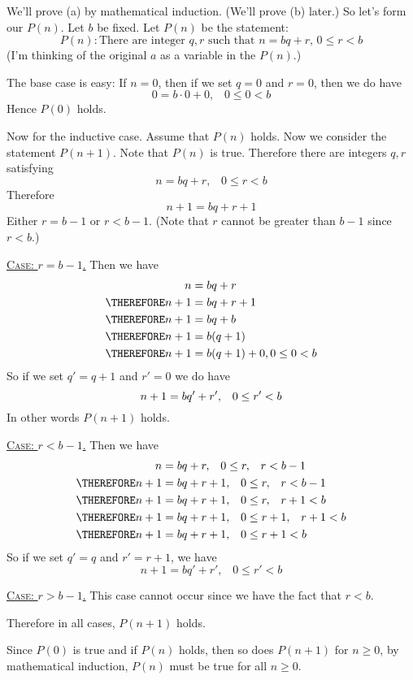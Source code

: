 
We'll prove (a) by mathematical induction.
(We'll prove (b) later.)
So let's form our $P(n)$.
Let $b$ be fixed.
Let $P(n)$ be the statement:
\[
P(n): \text{There are integer $q,r$ such that $n = bq + r$, $0 \leq r < b$}
\]
(I'm thinking of the original $a$ as a variable in the $P(n)$.)

The base case is easy: If $n = 0$, then if we set $q = 0$ and $r = 0$, then we do have
\[
0 = b \cdot 0 + 0, \,\,\,\,\, 0 \leq 0 < b
\]
Hence $P(0)$ holds.

Now for the inductive case. 
Assume that $P(n)$ holds.
Now we consider the statement $P(n+1)$.
Note that $P(n)$ is true. Therefore there are integers $q,r$ satisfying
\[
n = bq + r, \,\,\,\,\, 0 \leq r < b 
\]
Therefore
\[
n + 1 = bq + r + 1
\]
Either $r = b - 1$ or $r < b - 1$.
(Note that $r$ cannot be greater than $b - 1$ since $r < b$.)

\underline{\textsc{Case}: $r = b - 1$.}
Then we have
\begin{align*}
           n     &= bq + r       \\
\THEREFORE n + 1 &= bq + r + 1   \\
\THEREFORE n + 1 &= bq + b       \\
\THEREFORE n + 1 &= b(q + 1)     \\
\THEREFORE n + 1 &= b(q + 1) + 0, 0 \leq 0 < b \\
\end{align*}
So if we set $q' = q + 1$ and $r' = 0$ we do have
\[
n + 1 = bq' + r',\,\,\,\,\, 0 \leq r' < b \\
\]
In other words $P(n+1)$ holds.

\underline{\textsc{Case}: $r < b - 1$.}
Then we have
\begin{align*}
n     &= bq + r    , \,\,\,\,\, 0 \leq r, \,\,\,\,\, r < b - 1 \\
\THEREFORE n + 1 &= bq + r + 1, \,\,\,\,\, 0 \leq r, \,\,\,\,\, r < b - 1 \\
\THEREFORE n + 1 &= bq + r + 1, \,\,\,\,\, 0 \leq r, \,\,\,\,\, r + 1 < b \\
\THEREFORE n + 1 &= bq + r + 1, \,\,\,\,\, 0 \leq r + 1, \,\,\,\,\, r + 1 < b \\
\THEREFORE n + 1 &= bq + r + 1, \,\,\,\,\, 0 \leq r + 1 < b \\
\end{align*}
So if we set $q' = q$ and $r' = r + 1$, we have
\[
n + 1 = bq' + r', \,\,\,\,\, 0 \leq r' < b
\]

\underline{\textsc{Case}: $r > b - 1$.}
This case cannot occur since we have the fact that $r < b$.

Therefore in all cases, $P(n+1)$ holds.

Since $P(0)$ is true and if $P(n)$ holds,
then so does $P(n+1)$ for $n \geq 0$,
by mathematical induction, $P(n)$ must be true for all $n \geq 0$.
